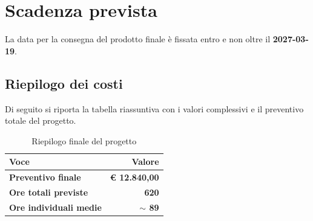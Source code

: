 \documentclass[11pt, a4paper]{article}
\begin{document}
\section{Scadenza prevista}
La data per la consegna del prodotto finale è fissata entro e non oltre il \textbf{2027-03-19}. 

\subsection{Riepilogo dei costi}
Di seguito si riporta la tabella riassuntiva con i valori complessivi e il preventivo totale del progetto.

\vspace{0.2cm}

\begin{table}[htbp]
    \centering
    \caption{Riepilogo finale del progetto}
    \vspace{0.2cm}
    \renewcommand{\arraystretch}{1.5}
    \begin{tabularx}{\textwidth}{|X|r|}
        \hline
        \rowcolor{gray!20} \textbf{Voce} & \textbf{Valore} \\ \hline
        \textbf{Preventivo finale} & \textbf{€ 12.840,00} \\ \hline
        \textbf{Ore totali previste} & \textbf{620} \\ \hline
        \textbf{Ore individuali medie} & \textbf{$\sim$ 89} \\ \hline
    \end{tabularx}
\end{table}
\end{document}
